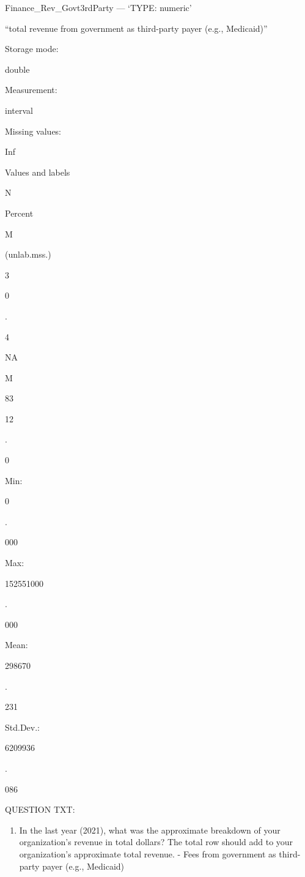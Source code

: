 \documentclass[
  letterpaper,
]{scrbook}
\providecommand{\tightlist}{%
  \setlength{\itemsep}{0pt}\setlength{\parskip}{0pt}}\usepackage{longtable,booktabs,array}
\begin{document}
\begin{enumerate}
\begin{enumerate}
    Finance\_Rev\_Govt3rdParty --- {`TYPE: numeric'}

    ``total revenue from government as third-party payer (e.g.,
    Medicaid)''

    Storage mode:

    double

    Measurement:

    interval

    Missing values:

    Inf

    Values and labels

    N

    Percent

    M

    (unlab.mss.)

    3

    0

    .

    4

    NA

    M

    83

    12

    .

    0

    Min:

    0

    .

    000

    Max:

    152551000

    .

    000

    Mean:

    298670

    .

    231

    Std.Dev.:

    6209936

    .

    086

    QUESTION TXT:

    \begin{enumerate}
    \def\labelenumiii{\arabic{enumiii}.}
    \setcounter{enumiii}{9}
    \tightlist
    \item
      In the last year (2021), what was the approximate breakdown of
      your organization's revenue in total dollars? The total row should
      add to your organization's approximate total revenue. - Fees from
      government as third-party payer (e.g., Medicaid)


\end{enumerate}
\end{enumerate}
\end{enumerate}
\end{document}
